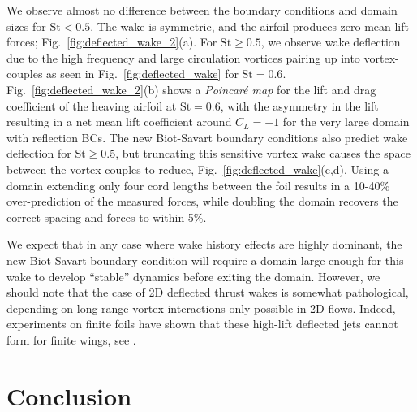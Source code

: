 \documentclass[final,1p,times]{elsarticle}
\begin{document}
We observe almost no difference between the boundary conditions and domain sizes for $\text{St}<0.5$. The wake is symmetric, and the airfoil produces zero mean lift forces; Fig.~\ref{fig:deflected_wake_2}(a). For $\text{St}\ge 0.5$, we observe wake deflection due to the high frequency and large circulation vortices pairing up into vortex-couples as seen in Fig.~\ref{fig:deflected_wake} for $\text{St}=0.6$. Fig.~\ref{fig:deflected_wake_2}(b) shows a \emph{Poincar\'e map} for the lift and drag coefficient of the heaving airfoil at $\text{St}=0.6$, with the asymmetry in the lift resulting in a net mean lift coefficient around $C_L=-1$ for the very large domain with reflection BCs. The new Biot-Savart boundary conditions also predict wake deflection for $\text{St}\ge 0.5$, but truncating this sensitive vortex wake causes the space between the vortex couples to reduce, Fig.~\ref{fig:deflected_wake}(c,d). Using a domain extending only four cord lengths between the foil results in a 10-40\% over-prediction of the measured forces, while doubling the domain recovers the correct spacing and forces to within 5\%.

We expect that in any case where wake history effects are highly dominant, the new Biot-Savart boundary condition will require a domain large enough for this wake to develop ``stable'' dynamics before exiting the domain. However, we should note that the case of 2D deflected thrust wakes is somewhat pathological, depending on long-range vortex interactions only possible in 2D flows. Indeed, experiments on finite foils have shown that these high-lift deflected jets cannot form for finite wings, see \cite{Calderon2014OnWings, Godoy-Diana2008TransitionFoil}.
 
\section{Conclusion}
\end{document}
